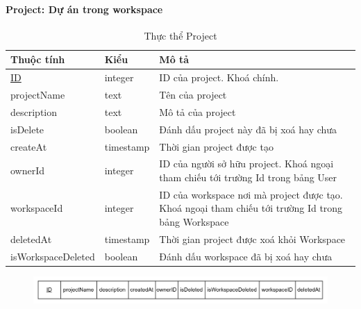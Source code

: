 \paragraph{Project: Dự án trong workspace}
\begin{center}
        \begin{table}[!h]
                \begin{tabular}{ |p{4cm} |p{3cm} |p{7cm}|} 
                        \hline
                                Thuộc tính & Kiểu & Mô tả \\ [0.5ex] 
                        \hline
                                \underline{ID} & integer & ID của project. Khoá chính. \\ 
                        \hline
                                projectName & text & Tên của project \\
                        \hline
                                description & text & Mô tả của project \\
                        \hline
                                isDelete & boolean & Đánh dấu project này đã bị xoá hay chưa \\
                        \hline
                                createAt & timestamp & Thời gian project được tạo \\
                        \hline
                                ownerId & integer & ID của người sở hữu project.
                                Khoá ngoại tham chiếu tới trường Id trong bảng User \\
                        \hline
                                workspaceId & integer & ID của workspace nơi mà project được tạo. Khoá ngoại tham chiếu tới trường Id trong bảng Workspace \\
                        \hline
                                deletedAt & timestamp & Thời gian project được xoá khỏi Workspace \\
                        \hline
                                isWorkspaceDeleted & boolean & Đánh dấu workspace đã bị xoá hay chưa \\
                        \hline
                \end{tabular}
                \caption{Thực thể Project}
        \end{table}
\end{center}

\begin{figure}[H]
        \centering
        \includegraphics[width=\textwidth]{Content/Phân tích và thiết kế hệ thống/images/ERD_mapping/project_mapping.png}
        \label{fig:Thực thể Project}
\end{figure}

